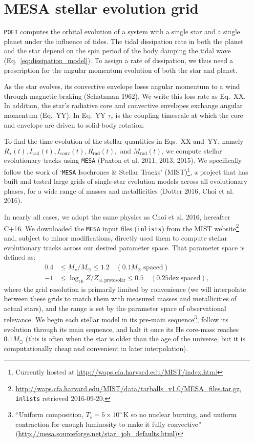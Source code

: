 \documentclass{article}
\begin{document}
\section{MESA stellar evolution grid}	
\label{sec:MESA}
\texttt{POET} computes the orbital evolution of a system with a single star and 
a single planet under the influence of tides.
The tidal dissipation rate in both the planet and the star depend on the
spin period of the body damping the tidal wave 
(Eq.~\protect\ref{eq:dissipation_model}).
To assign a rate of dissipation, we thus need a prescription for the angular 
momentum evolution of both the star and planet.

As the star evolves, its convective envelope loses angular momentum to 
a wind through magnetic braking (Schatzman 1962). We write this loss rate as 
Eq.~XX. In addition, the star's radiative core and convective envelopes 
exchange angular momentum (Eq.~YY). In Eq.~YY $\tau_c$ is the coupling timescale 
at which the core and envelope are driven to solid-body rotation. 

To find the time-evolution of the stellar quantities in 
Eqs.~XX and~YY, namely 
$R_\star(t),I_\mathrm{rad}(t),I_\mathrm{conv}(t),R_\mathrm{rad}(t),$ 
and $M_\mathrm{rad}(t)$, we compute stellar evolutionary tracks using 
\texttt{MESA} (Paxton et al. 2011, 2013, 2015).
We specifically follow the work of `\texttt{MESA} Isochrones \& Stellar Tracks' 
(MIST)\footnote{Currently hosted at 
\url{http://waps.cfa.harvard.edu/MIST/index.html}}, a project 
that has built and tested large grids of single-star 
evolution models across all evolutionary phases, for a wide range of masses and 
metallicities (Dotter 2016, Choi et al. 2016).

In nearly all cases, we adopt the same physics as Choi et al. 2016, hereafter 
C+16.
We downloaded the \texttt{MESA} input files (\texttt{inlists}) from the MIST 
website\footnote{\url{http://waps.cfa.harvard.edu/MIST/data/tarballs_v1.0/MESA_files.tar.gz},
\texttt{inlists} retrieved 2016-09-20.} and, subject to minor modifications, 
directly used them to compute stellar evolutionary tracks 
across our desired parameter space.
That parameter space is defined as:
\begin{align}
0.4 &\leq M_\star / M_\odot \leq 1.2\quad (0.1M_\odot\ \mathrm{spaced}) 
\label{eq:grid_defn0}\\
-1 &\leq \log_{10} Z/Z_{\odot,\mathrm{protosolar}} \leq 0.5\quad 
(0.25\mathrm{dex\ spaced}),
\label{eq:grid_defn1}
\end{align}
where the grid resolution is primarily limited by convenience (we will 
interpolate between these grids to match them with measured masses and 
metallicities of actual stars), and the range is set by the parameter space of 
observational relevance.
We begin each stellar model in its pre-main sequence\footnote{``Uniform 
composition, $T_c=5\times10^5\,\mathrm{K}$ so no nuclear burning, and uniform 
contraction for enough luminosity to make it fully convective'' 
(\url{http://mesa.sourceforge.net/star_job_defaults.html})}, follow its 
evolution
through its main sequence, and halt it once its He core-mass reaches 
$0.1M_\odot$ (this is often when the star is older than the age of the 
universe, but it is computationally cheap and convenient in later 
interpolation).
\end{document}
